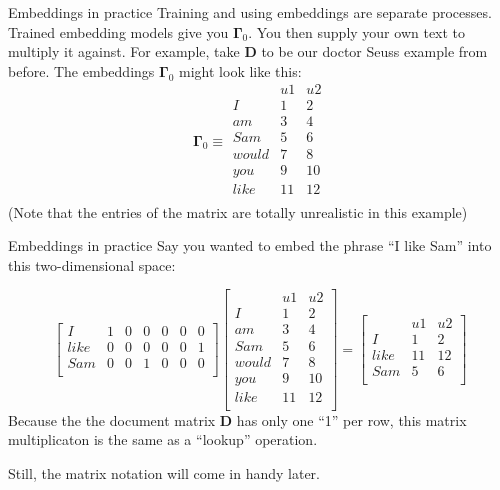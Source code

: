 \documentclass[10pt]{beamer}
\begin{document}
\begin{frame}{Embeddings in practice}
Training and using embeddings are separate processes.  Trained embedding models give you $\bm{\Gamma}_0$.  You then supply your own text to multiply it against.  For example, take $\bm{D}$ to be our doctor Seuss example from before.  The embeddings $\bm\Gamma_0$ might look like this:
\[  \bm{\Gamma}_0 \equiv
\begin{array}{c|cccccc}
     & u1 & u2 \\
     \hline
I    & 1 & 2 \\
am   & 3 & 4  \\
Sam  & 5 & 6   \\
would& 7 & 8  \\
you  & 9 & 10  \\
like & 11 & 12  \\
\end{array}\] 
(Note that the entries of the matrix are totally unrealistic in this example)

\end{frame}

\begin{frame}{Embeddings in practice}
Say you wanted to embed the phrase ``I like Sam'' into this two-dimensional space:

\[ 
\left[
\begin{array}{c|cccccc}
I    & 1 & 0  & 0   & 0     & 0   &  0 \\
like & 0 & 0  & 0   & 0     & 0   &  1 \\
Sam  & 0 & 0  & 1   & 0     & 0   &  0 \\
\end{array}\right]
\left[\begin{array}{c|cccccc}
     & u1 & u2 \\
     \hline
I    & 1 & 2 \\
am   & 3 & 4  \\
Sam  & 5 & 6   \\
would& 7 & 8  \\
you  & 9 & 10  \\
like & 11 & 12  \\
\end{array}\right] = 
\left[
\begin{array}{c|cccccc}
     & u1 & u2 \\
     \hline
I    & 1 & 2 \\
like & 11 & 12  \\
Sam  & 5 & 6   \\
\end{array}
\right]
\] 
Because the the document matrix $\bm{D}$ has only one ``1'' per row, this matrix multiplicaton is the same as a ``lookup'' operation.

Still, the matrix notation will come in handy later.

\end{frame}
\end{document}
